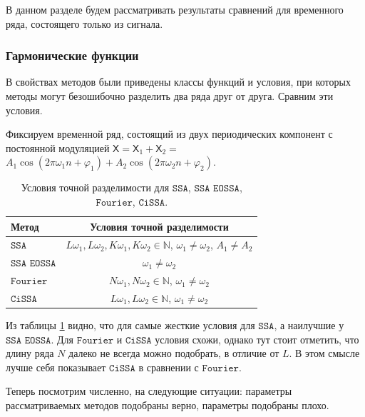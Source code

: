 \documentclass[12pt, specialist, subf
]{disser}
\theoremstyle{definition}
\newcommand{\SSA}{\texttt{SSA}}
\newcommand{\EOSSA}{\texttt{SSA EOSSA}}
\newcommand{\CISSA}{\texttt{CiSSA}}
\newcommand{\FOURIER}{\texttt{Fourier}}
\newcommand{\TS}{\mathsf{X}}
\begin{document}
В данном разделе будем рассматривать результаты сравнений для временного ряда, состоящего только из сигнала.



\subsubsection{Гармонические функции}
\label{subsubsec:exact}

В свойствах методов были приведены классы функций и условия, при которых методы могут безошибочно разделить два ряда друг от друга. Сравним эти условия.


Фиксируем временной ряд, состоящий из двух периодических компонент с постоянной модуляцией  $\TS = \TS_{1} + \TS_{2} =$ $A_1 \cos(2\pi \omega_1 n + \varphi_1) + A_2 \cos(2\pi \omega_2 n + \varphi_2)$.

\begin{table}[H]
    \centering
    \caption{Условия точной разделимости для $\SSA$, $\EOSSA$, $\FOURIER$, $\CISSA$.}
    \label{tab:separability_conditions}
    \begin{tabular}{l|c}
        \hline
        \textbf{Метод}     & \textbf{Условия точной разделимости} \\
        \hline
        $\SSA$     & $L\omega_1, L\omega_2, K\omega_1, K\omega_2 \in \mathbb{N}$, $\omega_1 \ne \omega_2$, $A_1 \ne A_2$ \\
        $\EOSSA$ & $\omega_1 \ne \omega_2$ \\
        $\FOURIER$     & $N\omega_1, N\omega_2 \in \mathbb{N}$, $\omega_1 \ne \omega_2$ \\
        $\CISSA$     & $L\omega_1, L\omega_2 \in \mathbb{N}$, $\omega_1 \ne \omega_2$ \\
        \hline
    \end{tabular}
\end{table}

Из таблицы \ref{tab:separability_conditions} видно, что для самые жесткие условия для $\SSA$, а наилучшие у $\EOSSA$.  Для $\FOURIER$ и $\CISSA$ условия схожи, однако тут стоит отметить, что длину ряда $N$ далеко не всегда можно подобрать, в отличие от $L$. В этом смысле лучше себя показывает $\CISSA$ в сравнении с $\FOURIER$.

Теперь посмотрим численно, на следующие ситуации: параметры рассматриваемых методов подобраны верно, параметры подобраны плохо.


\end{document}
